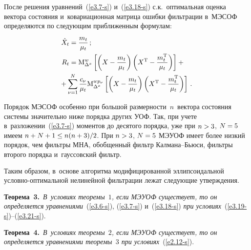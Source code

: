 \begin{multicols}{2}
После решения уравнений~(\ref{e3.7-s}) и~(\ref{e3.18-s})  с.к.\ оптимальная оценка
вектора состояния и~ковариационная матрица ошибки фильтрации 
в~МЭСОФ определяют\-ся по следующим приближенным формулам:
    \begin{align}
    \hat X_t &= \fr{m_t}{\mu_t}\,;\label{e3.20-s}\\
    R_t &= \mm_{\Delta^x}^{w} \left[\left( X-\fr{m_t}{\mu_t}\right) 
    \left( X^{\mathrm{T}}-\fr{m_t^{\mathrm{T}}}{\mu_t}\right)\right] +{}\notag\\
   &\hspace*{-5mm}{}+ \sss_{\nu=1}^N \fr{c_\nu}{\mu_t} \mm_{\Delta^x}^{w p_\nu}\left[
    \left( X-\fr{m_t}{\mu_t}\right) \left( X^{\mathrm{T}}-
    \fr{m_t^{\mathrm{T}}}{\mu_t}\right) \right]\,.
    \label{e3.21-s}
    \end{align}

Порядок МЭСОФ особенно при большой размерности~$n$~вектора состояния
системы значительно ниже порядка других УОФ. 
Так, при учете в~разложении~(\ref{e3.7-s}) моментов до десятого
порядка, уже при $n\hm>3$,
 $N\hm=5$ имеем $n\hm+ N\hm+1 \hm\le n(n\hm+3)/2$.
При $n\hm>3$, $N\hm=5$ МЭУОФ имеет более низкий порядок, чем фильтры 
МНА, обобщенный фильтр Кал\-ма\-на--Бью\-си, фильтры
второго порядка и~гауссовский фильтр.

Таким образом, в~основе алгоритма модифицированной эллипсоидальной 
услов\-но-оп\-ти\-маль\-ной нелинейной фильтрации лежат следующие утверждения.

\smallskip

\noindent
\textbf{Теорема~3.}\
\textit{В~условиях теоремы~$1$, если МЭУОФ существует, то он 
определяется уравнениями}~(\ref{e3.6-s}), (\ref{e3.7-s}) и~(\ref{e3.18-s}) 
\textit{при условиях}~(\ref{e3.19-s})--(\ref{e3.21-s}).

\smallskip

\noindent
\textbf{Теорема~4.}\
\textit{В~условиях теоремы~$2$, если МЭУОФ существует, то он определяется 
уравнениями теоремы~$3$ при условиях}~(\ref{e2.12-s}).

\smallskip


\end{multicols}
